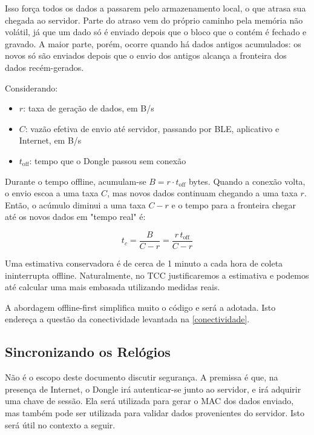 \documentclass[12pt]{article}
\begin{document}
Isso força todos os dados a passarem pelo armazenamento local, o que atrasa sua chegada ao servidor. Parte do atraso vem do próprio caminho pela memória não volátil, já que um dado só é enviado depois que o bloco que o contém é fechado e gravado. A maior parte, porém, ocorre quando há dados antigos acumulados: os novos só são enviados depois que o envio dos antigos alcança a fronteira dos dados recém-gerados.

Considerando:

\begin{itemize}
    \item $r$: taxa de geração de dados, em B/s
    \item $C$: vazão efetiva de envio até servidor, passando por BLE, aplicativo e Internet, em B/s
    \item \textbf{$t_{\mathrm{off}}$}: tempo que o Dongle passou sem conexão
\end{itemize}

Durante o tempo offline, acumulam-se $B = r \cdot t_{\mathrm{off}}$ bytes. Quando a conexão volta, o envio escoa a uma taxa $C$, mas novos dados continuam chegando a uma taxa $r$. Então, o acúmulo diminui a uma taxa $C-r$ e o tempo para a fronteira chegar até os novos dados em "tempo real" é:

\begin{equation}
t_c =  \frac{B}{C - r} = \frac{r \, t_{\mathrm{off}}}{C - r}
\label{eq:tempo_recuperacao}
\end{equation}

Uma estimativa conservadora é de cerca de 1 minuto a cada hora de coleta ininterrupta offline. Naturalmente, no TCC justificaremos a estimativa e podemos até calcular uma mais embasada utilizando medidas reais. 

A abordagem offline-first simplifica muito o código e será a adotada. Isto endereça a questão da conectividade levantada na \autoref{conectividade}.

\subsection{Sincronizando os Relógios}

Não é o escopo deste documento discutir segurança. A premissa é que, na presença de Internet, o Dongle irá autenticar-se junto ao servidor, e irá adquirir uma chave de sessão. Ela será utilizada para gerar o MAC dos dados enviado, mas também pode ser utilizada para validar dados provenientes do servidor. Isto será útil no contexto a seguir.
\end{document}
